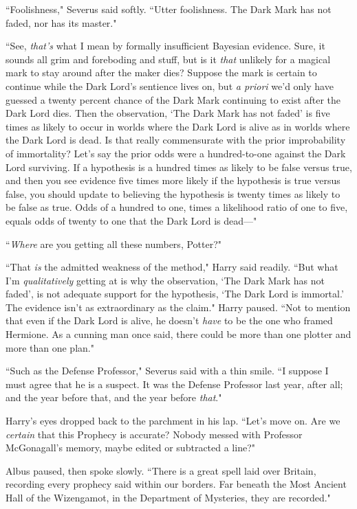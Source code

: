 ``Foolishness," Severus said softly. ``Utter foolishness. The Dark Mark has not faded, nor has its master."

``See, \emph{that's} what I mean by formally insufficient Bayesian evidence. Sure, it sounds all grim and foreboding and stuff, but is it \emph{that} unlikely for a magical mark to stay around after the maker dies? Suppose the mark is certain to continue while the Dark Lord's sentience lives on, but \emph{a priori} we'd only have guessed a twenty percent chance of the Dark Mark continuing to exist after the Dark Lord dies. Then the observation, `The Dark Mark has not faded' is five times as likely to occur in worlds where the Dark Lord is alive as in worlds where the Dark Lord is dead. Is that really commensurate with the prior improbability of immortality? Let's say the prior odds were a hundred-to-one against the Dark Lord surviving. If a hypothesis is a hundred times as likely to be false versus true, and then you see evidence five times more likely if the hypothesis is true versus false, you should update to believing the hypothesis is twenty times as likely to be false as true. Odds of a hundred to one, times a likelihood ratio of one to five, equals odds of twenty to one that the Dark Lord is dead—"

``\emph{Where} are you getting all these numbers, Potter?"

``That \emph{is} the admitted weakness of the method," Harry said readily. ``But what I'm \emph{qualitatively} getting at is why the observation, `The Dark Mark has not faded', is not adequate support for the hypothesis, `The Dark Lord is immortal.' The evidence isn't as extraordinary as the claim." Harry paused. ``Not to mention that even if the Dark Lord is alive, he doesn't \emph{have} to be the one who framed Hermione. As a cunning man once said, there could be more than one plotter and more than one plan."

``Such as the Defense Professor," Severus said with a thin smile. ``I suppose I must agree that he is a suspect. It was the Defense Professor last year, after all; and the year before that, and the year before \emph{that}."

Harry's eyes dropped back to the parchment in his lap. ``Let's move on. Are we \emph{certain} that this Prophecy is accurate? Nobody messed with Professor McGonagall's memory, maybe edited or subtracted a line?"

Albus paused, then spoke slowly. ``There is a great spell laid over Britain, recording every prophecy said within our borders. Far beneath the Most Ancient Hall of the Wizengamot, in the Department of Mysteries, they are recorded."


